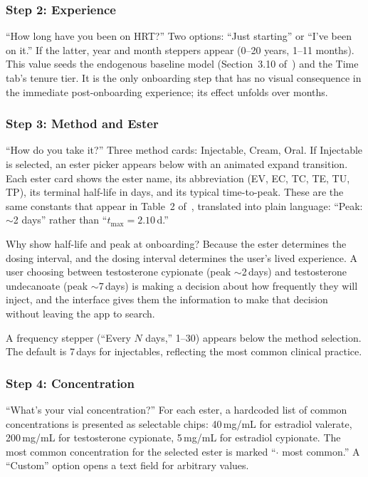 \documentclass[11pt,a4paper]{article}
\begin{document}
\subsubsection{Step 2: Experience}

``How long have you been on HRT?'' Two options: ``Just starting'' or
``I've been on it.'' If the latter, year and month steppers appear (0--20
years, 1--11 months). This value seeds the endogenous baseline model
(Section~3.10 of~\cite{xtpk}) and the Time tab's tenure tier. It is the
only onboarding step that has no visual consequence in the immediate
post-onboarding experience; its effect unfolds over months.

\subsubsection{Step 3: Method and Ester}

``How do you take it?'' Three method cards: Injectable, Cream, Oral. If
Injectable is selected, an ester picker appears below with an animated
expand transition. Each ester card shows the ester name, its abbreviation
(EV, EC, TC, TE, TU, TP), its terminal half-life in days, and its typical
time-to-peak. These are the same constants that appear in
Table~2 of~\cite{xtpk}, translated into plain language: ``Peak: $\sim$2
days'' rather than ``$t_{\max} = 2.10$\,d.''

Why show half-life and peak at onboarding? Because the ester determines
the dosing interval, and the dosing interval determines the user's lived
experience. A user choosing between testosterone cypionate (peak
$\sim$2\,days) and testosterone undecanoate (peak $\sim$7\,days) is
making a decision about how frequently they will inject, and the
interface gives them the information to make that decision without leaving
the app to search.

A frequency stepper (``Every $N$ days,'' 1--30) appears below the method
selection. The default is 7\,days for injectables, reflecting the most
common clinical practice.

\subsubsection{Step 4: Concentration}

``What's your vial concentration?'' For each ester, a hardcoded list of
common concentrations is presented as selectable chips: 40\,mg/mL for
estradiol valerate, 200\,mg/mL for testosterone cypionate, 5\,mg/mL for
estradiol cypionate. The most common concentration for the selected ester
is marked ``$\cdot$ most common.'' A ``Custom'' option opens a text field
for arbitrary values.
\end{document}
